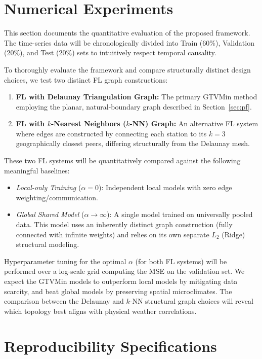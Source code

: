 \documentclass{article}
\begin{document}
\section{Numerical Experiments}
\label{sec:experiments}

This section documents the quantitative evaluation of the proposed framework. The time-series data will be chronologically divided into Train (60\%), Validation (20\%), and Test (20\%) sets to intuitively respect temporal causality.

To thoroughly evaluate the framework and compare structurally distinct design choices, we test two distinct FL graph constructions:
\begin{enumerate}
    \item \textbf{FL with Delaunay Triangulation Graph:} The primary GTVMin method employing the planar, natural-boundary graph described in Section~\ref{sec:pf}.
    \item \textbf{FL with $k$-Nearest Neighbors ($k$-NN) Graph:} An alternative FL system where edges are constructed by connecting each station to its $k=3$ geographically closest peers, differing structurally from the Delaunay mesh.
\end{enumerate}

These two FL systems will be quantitatively compared against the following meaningful baselines:
\begin{itemize}
    \item \textit{Local-only Training} ($\alpha = 0$): Independent local models with zero edge weighting/communication.
    \item \textit{Global Shared Model} ($\alpha \to \infty$): A single model trained on universally pooled data. This model uses an inherently distinct graph construction (fully connected with infinite weights) and relies on its own separate $L_2$ (Ridge) structural modeling.
\end{itemize}

Hyperparameter tuning for the optimal $\alpha$ (for both FL systems) will be performed over a log-scale grid computing the MSE on the validation set. We expect the GTVMin models to outperform local models by mitigating data scarcity, and beat global models by preserving spatial microclimates. The comparison between the Delaunay and $k$-NN structural graph choices will reveal which topology best aligns with physical weather correlations.

\section{Reproducibility Specifications}
\label{sec:reproducibility}
\end{document}
